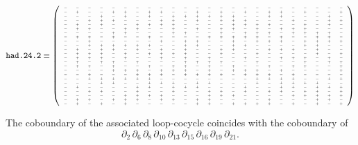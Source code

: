 \documentclass[11pt,a4paper]{article}
\begin{document}
 \[\texttt{had.24.2}\equiv {\fontsize{4}{5}\selectfont \left( \begin{array}{cccccccccccccccccccccccc}
-&-&-&-&-&-&-&-&-&-&-&-&-&-&-&-&-&-&-&-&-&-&-&-\\
-&+&-&-&+&+&-&+&+&-&-&+&-&+&-&+&-&+&+&-&+&-&-&+\\
-&-&-&+&-&+&-&+&-&+&+&+&+&+&+&-&-&+&+&-&-&-&+&-\\
-&-&+&+&+&-&-&-&+&+&-&+&-&+&+&+&-&-&-&+&-&-&+&+\\
-&+&-&+&-&-&+&+&+&+&-&-&-&-&+&+&+&+&-&-&+&-&+&-\\
-&+&+&-&-&+&+&-&-&+&-&+&-&+&+&-&+&-&+&+&+&-&-&-\\
-&-&-&-&+&+&-&-&-&+&+&-&-&+&-&+&+&+&-&+&+&+&+&-\\
-&+&+&-&+&-&-&+&-&-&-&-&+&+&+&+&+&-&+&-&-&+&+&-\\
-&-&+&-&-&-&-&-&+&-&+&+&-&-&+&-&+&+&+&-&+&+&+&+\\
-&-&+&+&+&+&+&+&-&-&+&+&-&-&+&+&-&-&-&-&+&+&-&-\\
-&+&-&+&+&-&+&-&+&-&+&-&-&+&+&-&-&+&+&+&-&+&-&-\\
-&+&+&+&-&+&-&+&+&+&+&-&-&+&-&-&+&-&-&-&-&+&-&+\\
-&+&+&+&-&+&-&-&+&-&+&-&+&-&-&+&-&-&+&+&+&-&+&-\\
-&+&-&+&+&-&+&-&-&-&+&+&+&+&-&-&+&-&-&-&+&-&+&+\\
-&+&+&-&+&-&-&+&-&+&+&-&+&-&+&-&-&+&-&+&+&-&-&+\\
-&-&-&-&+&+&+&-&+&+&+&-&+&-&+&+&+&-&+&-&-&-&-&+\\
-&-&+&-&-&-&+&+&+&-&+&+&+&+&-&+&+&+&-&+&-&-&-&-\\
-&-&+&+&+&+&+&+&-&-&-&-&-&-&-&-&+&+&+&+&-&-&+&+\\
-&-&-&+&+&-&-&+&+&+&-&+&+&-&-&-&+&-&+&+&+&+&-&-\\
-&+&-&-&-&-&+&+&-&+&+&+&-&-&-&+&-&-&+&+&-&+&+&+\\
-&-&+&+&-&-&+&-&-&+&-&-&+&+&-&+&-&+&+&-&+&+&-&+\\
-&-&-&-&-&+&+&+&+&-&-&-&+&+&+&-&-&-&-&+&+&+&+&+\\
-&+&+&-&+&+&+&-&+&+&-&+&+&-&-&-&-&+&-&-&-&+&+&-\\
-&+&-&+&-&+&-&-&-&-&-&+&+&-&+&+&+&+&-&+&-&+&-&+
  \end{array}
  \right)}\]

The coboundary of the associated loop-cocycle coincides with the coboundary of
\[\partial_2\,\partial_6\,\partial_8\,\partial_{10}\,\partial_{13}\,\partial_{15}\,\partial_{16}\,\partial_{19}\,\partial_{21}.\]
\end{document}
